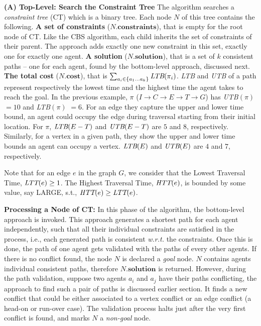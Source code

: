 \documentclass{article}
\begin{document}
{\vspace{0.05cm}
\noindent\textbf{(A) Top-Level: Search the Constraint Tree}
The algorithm searches a \emph{constraint tree} (CT) which is a binary tree. Each node $N$ of this tree contains the following. \textbf{A set of constraints} ($N$.$\mathbf{constraints}$), that is empty for the root node of CT. Like the CBS algorithm, each child inherits the set of constraints of their parent. The approach adds exactly one new constraint in this set, exactly one for exactly one agent. \textbf{A solution} ($N$.$\mathbf{solution}$), that is a set of $k$ consistent paths -- one for each agent, found by the bottom-level approach, discussed next. \textbf{The total cost} ($N$.$\mathbf{cost}$), that is $\sum_{a_i \in \{a_1...a_k\}} \emph{LTB}(\pi_i)$. \emph{LTB} and \emph{UTB} of a path represent respectively the lowest time and the highest time the agent takes to reach the goal. In the previous example, $\pi$ ($I \rightarrow C \rightarrow E \rightarrow T \rightarrow G$) has \emph{UTB$(\pi)$} $= 10$ and \emph{LTB$(\pi)$} $= 6$. For an edge they capture the upper and lower time bound, an agent could occupy the edge during traversal starting from their initial location. For $\pi$, $\emph{LTB}(E-T)$ and $\emph{UTB}(E-T)$ are $5$ and $8$, respectively. Similarly, for a vertex in a given path, they show the upper and lower time bounds an agent can occupy a vertex. $\emph{LTB}(E)$ and $\emph{UTB}(E)$ are $4$ and $7$, respectively.  

Note that for an edge $e$ in the graph $G$, we consider that the Lowest Traversal Time, $\emph{LTT}(e) \geq 1$. The Highest Traversal Time, $\emph{HTT}(e)$, is bounded by some value, say LARGE, s.t., $\emph{HTT}(e) \geq \emph{LTT}(e)$.

\noindent \textbf{Processing a Node of CT:} In this phase of the algorithm, the bottom-level approach is invoked. This approach generates a shortest path for each agent independently, such that all their individual constraints are satisfied in the process, i.e., each generated path is consistent \emph{w.r.t.} the constraints. 
Once this is done, the path of one agent gets validated with the paths of every other agents. If there is no conflict found, the node $N$ is declared a \emph{goal} node. $N$ contains agents individual consistent paths, therefore $N.\mathbf{solution}$ is returned. 
However, during the path validation, suppose two agents $a_i$ and $a_j$ have their paths conflicting, the approach to find such a pair of paths is discussed earlier section. It finds a new conflict that could be either associated to a vertex conflict or an edge conflict (a head-on or run-over case). The validation process halts just after the very first conflict is found, and marks $N$ a \emph{non-goal} node.

}
\end{document}
